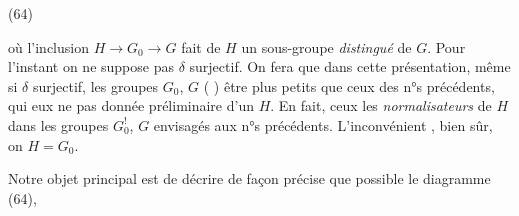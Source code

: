 \documentclass[11pt,a4paper]{article}
\begin{document}
(64)


où l'inclusion $H \to G_0 \to G$ fait de $H$ un sous-groupe \emph{distingué} de $G$. Pour l'instant on ne suppose pas $\delta$ surjectif. On fera  que dans cette présentation, même si $\delta$ surjectif, les groupes $G_0$, $G$ ( ) \struck{\ill{}}  être plus petits que ceux des n°s précédents, qui eux ne  pas   donnée préliminaire d'un $H$. En fait, ceux \struck{\ill{}}  les \emph{normalisateurs} de $H$ dans les groupes $G_0^{!}$, $G$ envisagés aux n°s précédents. L'inconvénient \struck{\ill{}}  , bien sûr, on  $H = G_0$.

Notre objet principal est de décrire de façon  précise que possible le diagramme (64),
\end{document}
